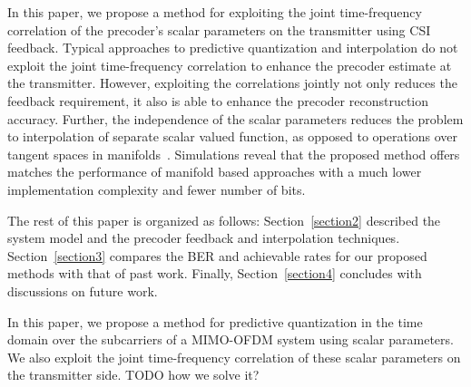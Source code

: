 \documentclass[conference]{IEEEtran}
\begin{document}
In this paper, we propose a method for exploiting the joint time-frequency correlation of the precoder's scalar parameters on the transmitter using CSI feedback. Typical approaches to predictive quantization and interpolation do not exploit the joint time-frequency correlation to enhance the precoder estimate at the transmitter. However, exploiting the correlations jointly not only reduces the feedback requirement, it also is able to enhance the precoder reconstruction accuracy. Further, the independence of the scalar parameters reduces the problem to interpolation of separate scalar valued function, as opposed to operations over tangent spaces in manifolds~\cite{Gupt1905:Predictive}. Simulations reveal that the proposed method offers matches the performance of manifold based approaches with a much lower implementation complexity and fewer number of bits.


The rest of this paper is organized as follows: Section~\ref{section2} described the system model and the precoder feedback and interpolation techniques. Section~\ref{section3} compares the BER and achievable rates for our proposed methods with that of past work. Finally, Section~\ref{section4} concludes with discussions on future work.


In this paper, we propose a method for predictive quantization in the time domain over the subcarriers of a MIMO-OFDM system using scalar parameters. We also exploit the joint time-frequency correlation of these scalar parameters on the transmitter side. TODO how we solve it?
\end{document}
